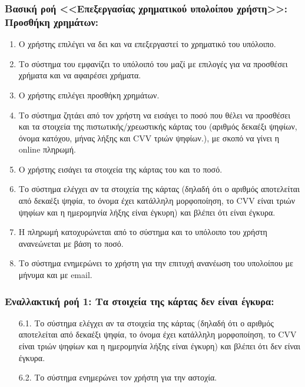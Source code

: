 \documentclass[12pt,a4paper]{article}
\begin{document}
\subsubsection*{Βασική ροή <<Επεξεργασίας χρηματικού υπολοίπου χρήστη>>: Προσθήκη χρημάτων:}
\begin{enumerate}
    \item Ο χρήστης επιλέγει να δει και να επεξεργαστεί το χρηματικό του υπόλοιπο. 
    \item Το σύστημα του εμφανίζει το υπόλοιπό του μαζί με επιλογές για να προσθέσει χρήματα και να αφαιρέσει χρήματα.
    \item Ο χρήστης επιλέγει προσθήκη χρημάτων.
    \item Το σύστημα ζητάει από τον χρήστη να εισάγει το ποσό που θέλει να προσθέσει και τα στοιχεία της πιστωτικής/χρεωστικής κάρτας του (αριθμός δεκαέξι ψηφίων, όνομα κατόχου, μήνας λήξης και CVV τριών ψηφίων.), με σκοπό να γίνει η online πληρωμή.
    \item Ο χρήστης εισάγει τα στοιχεία της κάρτας του και το ποσό.
    \item Το σύστημα ελέγχει αν τα στοιχεία της κάρτας (δηλαδή ότι ο αριθμός αποτελείται από δεκαέξι ψηφία, το όνομα έχει κατάλληλη μορφοποίηση, το CVV είναι τριών ψηφίων και η ημερομηνία λήξης είναι έγκυρη) και βλέπει ότι είναι έγκυρα.
    \item H πληρωμή κατοχυρώνεται από το σύστημα και το υπόλοιπο του χρήστη ανανεώνεται με βάση το ποσό.
    \item Το σύστημα ενημερώνει το χρήστη για την επιτυχή ανανέωση του υπολοίπου με μήνυμα και με email.
\end{enumerate}

\subsubsection*{Εναλλακτική ροή 1: Τα στοιχεία της κάρτας δεν είναι έγκυρα:}
\begin{enumerate}
    \item [6.1.] Το σύστημα ελέγχει αν τα στοιχεία της κάρτας (δηλαδή ότι ο αριθμός αποτελείται από δεκαέξι ψηφία, το όνομα έχει κατάλληλη μορφοποίηση, το CVV είναι τριών ψηφίων και η ημερομηνία λήξης είναι έγκυρη) και βλέπει ότι δεν είναι έγκυρα.
    \item [6.2.] Το σύστημα ενημερώνει τον χρήστη για την αστοχία.
\end{enumerate}
\end{document}
